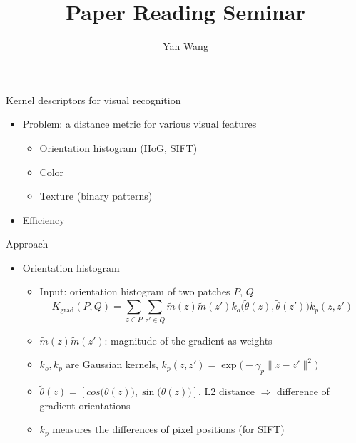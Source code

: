 \documentclass[12pt]{beamer}
\author{Yan Wang}
\title{Paper Reading Seminar}
\subtitle{}
\begin{document}
\begin{frame}[plain]
	\titlepage
\end{frame}

\begin{frame}{Kernel descriptors for visual recognition}
    \begin{itemize}
        \item Problem: a distance metric for various visual features
        \begin{itemize}
            \item Orientation histogram (HoG, SIFT)
            \item Color
            \item Texture (binary patterns)
        \end{itemize}
        \item Efficiency
    \end{itemize}
\end{frame}

\begin{frame}{Approach}
    \begin{itemize}
        \item Orientation histogram
        \begin{itemize}
            \item Input: orientation histogram of two patches $P$, $Q$
            \[ K_\text{grad}(P, Q) = \sum_{z \in P} \sum_{z' \in Q} \tilde{m} (z) \tilde{m}(z') k_o\big(\tilde{\theta}(z), \tilde{\theta}(z')\big) k_p(z, z') \]
            \item $\tilde{m}(z) \tilde{m}(z')$: magnitude of the gradient as weights
            \item $k_o, k_p$ are Gaussian kernels, $k_p(z, z') = \exp \big( -\gamma_p \lVert z - z' \rVert^2 \big) $
            \item $\tilde{\theta}(z) = [cos\big(\theta(z)\big), \sin\big(\theta(z)\big)]$. L2 distance $\Rightarrow$ difference of gradient orientations
            \item $k_p$ measures the differences of pixel positions (for SIFT)
        \end{itemize}
    \end{itemize}
\end{frame}
\end{document}
